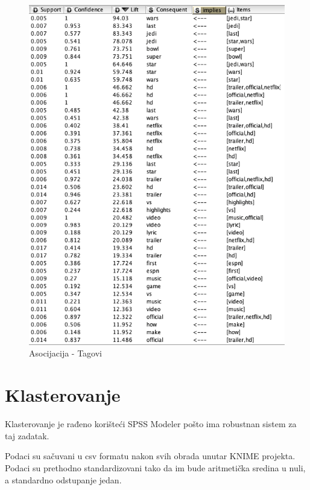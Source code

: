 \documentclass[a4paper]{article}
\theoremstyle{definition}
\begin{document}
\begin{figure}[H]
\begin{center}
    \includegraphics[width=1\textwidth]{association2.png}
    \caption{Asocijacija - Tagovi}
     \label{fig:asoc2}
\end{center}
\end{figure}

\section{Klasterovanje}
\label{sec:dod}

Klasterovanje je rađeno korišteći SPSS Modeler pošto ima robustnan sistem za taj zadatak.

Podaci su sačuvani u csv formatu nakon svih obrada unutar KNIME projekta. Podaci su prethodno standardizovani tako da im bude aritmetička sredina u nuli,
a standardno odstupanje jedan.
\end{document}
